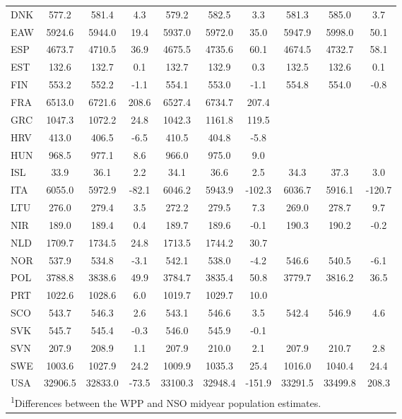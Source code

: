 \documentclass[12pt]{article}
\begin{document}
\begin{table}[ht]
\begin{tabular}{lccc|ccc|ccc}
DNK & 577.2 & 581.4 & 4.3 & 579.2 & 582.5 & 3.3 & 581.3 & 585.0 & 3.7\\
EAW & 5924.6 & 5944.0 & 19.4 & 5937.0 & 5972.0 & 35.0 & 5947.9 & 5998.0 & 50.1\\
ESP & 4673.7 & 4710.5 & 36.9 & 4675.5 & 4735.6 & 60.1 & 4674.5 & 4732.7 & 58.1\\
EST & 132.6 & 132.7 & 0.1 & 132.7 & 132.9 & 0.3 & 132.5 & 132.6 & 0.1\\
FIN & 553.2 & 552.2 & -1.1 & 554.1 & 553.0 & -1.1 & 554.8 & 554.0 & -0.8\\
FRA & 6513.0 & 6721.6 & 208.6 & 6527.4 & 6734.7 & 207.4 &  &  & \\
GRC & 1047.3 & 1072.2 & 24.8 & 1042.3 & 1161.8 & 119.5 &  &  & \\
HRV & 413.0 & 406.5 & -6.5 & 410.5 & 404.8 & -5.8 &  &  & \\
HUN & 968.5 & 977.1 & 8.6 & 966.0 & 975.0 & 9.0 &  &  & \\
ISL & 33.9 & 36.1 & 2.2 & 34.1 & 36.6 & 2.5 & 34.3 & 37.3 & 3.0\\
ITA & 6055.0 & 5972.9 & -82.1 & 6046.2 & 5943.9 & -102.3 & 6036.7 & 5916.1 & -120.7\\
LTU & 276.0 & 279.4 & 3.5 & 272.2 & 279.5 & 7.3 & 269.0 & 278.7 & 9.7\\
NIR & 189.0 & 189.4 & 0.4 & 189.7 & 189.6 & -0.1 & 190.3 & 190.2 & -0.2\\
NLD & 1709.7 & 1734.5 & 24.8 & 1713.5 & 1744.2 & 30.7 &  &  & \\
NOR & 537.9 & 534.8 & -3.1 & 542.1 & 538.0 & -4.2 & 546.6 & 540.5 & -6.1\\
POL & 3788.8 & 3838.6 & 49.9 & 3784.7 & 3835.4 & 50.8 & 3779.7 & 3816.2 & 36.5\\
PRT & 1022.6 & 1028.6 & 6.0 & 1019.7 & 1029.7 & 10.0 &  &  & \\
SCO & 543.7 & 546.3 & 2.6 & 543.1 & 546.6 & 3.5 & 542.4 & 546.9 & 4.6\\
SVK & 545.7 & 545.4 & -0.3 & 546.0 & 545.9 & -0.1 &  &  & \\
SVN & 207.9 & 208.9 & 1.1 & 207.9 & 210.0 & 2.1 & 207.9 & 210.7 & 2.8\\
SWE & 1003.6 & 1027.9 & 24.2 & 1009.9 & 1035.3 & 25.4 & 1016.0 & 1040.4 & 24.4\\
USA & 32906.5 & 32833.0 & -73.5 & 33100.3 & 32948.4 & -151.9 & 33291.5 & 33499.8 & 208.3\\
\bottomrule
\multicolumn{9}{l}{\textsuperscript{1}Differences between the WPP and NSO midyear population estimates.} \\
\end{tabular}
\end{table}
\end{document}
